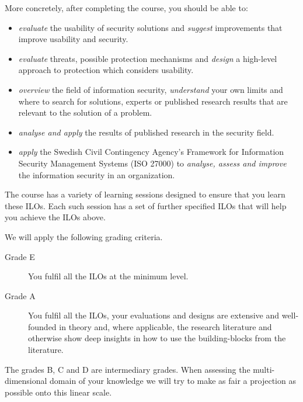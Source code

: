 \mode*

More concretely, after completing the course, you should be able to:
\begin{frame}
\begin{itemize}
  \item \emph{evaluate} the usability of security solutions and \emph{suggest} 
    improvements that improve usability and security.
  \item \emph{evaluate} threats, possible protection mechanisms and 
    \emph{design} a high-level approach to protection which considers 
    usability.
  \item \emph{overview} the field of information security, \emph{understand} 
    your own limits and where to search for solutions, \eg experts or published 
    research results that are relevant to the solution of a problem.
  \item \emph{analyse and apply} the results of published research in the 
    security field.
  \item \emph{apply} the Swedish Civil Contingency Agency's Framework for 
    Information Security Management Systems (ISO 27000) to \emph{analyse, assess 
      and improve} the information security in an organization.
\end{itemize}
\end{frame}
The course has a variety of learning sessions designed to ensure that you learn 
these \acp{ILO}.
Each such session has a set of further specified \acp{ILO} that will help you 
achieve the \acp{ILO} above.

We will apply the following grading criteria.
\begin{frame}
\begin{description}
  \item[Grade E] You fulfil all the \acp{ILO} at the minimum level.
  \item[Grade A] You fulfil all the \acp{ILO},
    your evaluations and designs are extensive and well-founded in theory and, 
    where applicable, the research literature and otherwise show deep insights 
    in how to use the building-blocks from the literature.
\end{description}
\end{frame}
The grades B, C and D are intermediary grades.
When assessing the multi-dimensional domain of your knowledge we will try to 
make as fair a projection as possible onto this linear scale.

